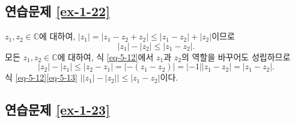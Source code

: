 \subsection*{연습문제 \ref{ex-1-22}}

$z_1, z_2\in\mathbb C$에 대하여,
$|z_1| = |z_1 - z_2 + z_2| \le |z_1 - z_2| + |z_2|$이므로
\begin{equation} \label{eq-5-12}
|z_1| - |z_2| \le |z_1 - z_2|.
\end{equation}
모든 $z_1, z_2\in\mathbb C$에 대하여,
식 \eqref{eq-5-12}에서 $z_1$과 $z_2$의 역할을 바꾸어도 성립하므로
\begin{equation}\label{eq-5-13}
|z_2| - |z_1| \le |z_2 - z_1| = |-(z_1-z_2)|
= |-1| |z_1-z_2| =|z_1-z_2|.
\end{equation}
식 \ref{eq-5-12}\와 \ref{eq-5-13} 
$\left| |z_1| -|z_2| \right| \le |z_1 - z_2|$이다.

\subsection*{연습문제 \ref{ex-1-23}}

